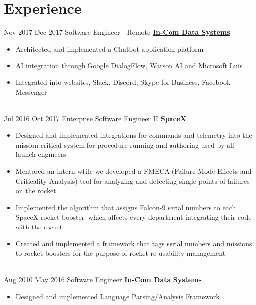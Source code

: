 \documentclass[letterpaper]{resume}
\begin{document}
	
\makeprofile %

\section{Experience}
\begin{twenty}
	\twentyitem
	{Nov 2017}
	{Dec 2017}
	{Software Engineer - Remote}
	{\href{http://in-com.com/}{\textbf{In-Com Data Systems}}}
	{}
	{
		\begin{itemize}
			\item Architected and implemented a Chatbot application platform  {}
			\item AI integration through Google DialogFlow, Watson AI and Microsoft Luis
			\item Integrated into websites, Slack, Discord, Skype for Business, Facebook Messenger
			
		\end{itemize}
	}
	\\
	
	\twentyitem
	{Jul 2016}
	{Oct 2017}
	{Enterprise Software Engineer II}
	{\href{http://www.spacex.com/}{\textbf{SpaceX}}}
	{}
	{\begin{itemize}
			\item Designed and implemented integrations for commands and telemetry into the mission-critical system for procedure running and authoring used by all launch engineers
			
			\item Mentored an intern while we developed a FMECA (Failure Mode Effects and Criticality Analysis) tool for analyzing and detecting single points of failures on the rocket
			
			\item Implemented the algorithm that assigns Falcon-9 serial numbers to each SpaceX rocket booster, which affects every department integrating their code with the rocket
			
			\item Created and implemented a framework that tags serial numbers and missions to rocket boosters for the purpose of rocket re-usability management
			
	\end{itemize}}
	
	\\
	
	\twentyitem
	{Aug 2010}
	{May 2016}
	{Software Engineer}
	{\href{http://in-com.com/}{\textbf{In-Com Data Systems}}}
	{}
	{
		\begin{itemize}
			\item Designed and implemented Language Parsing/Analysis Framework {}
			

\end{itemize}}
\end{twenty}
\end{document}
